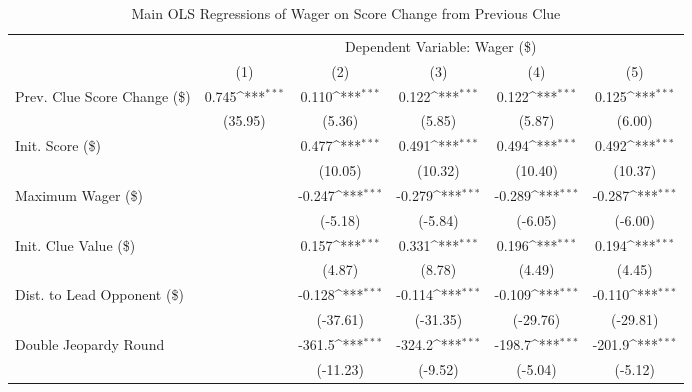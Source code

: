 \begin{table}[htbp]\centering
\def\sym#1{\ifmmode^{#1}\else\(^{#1}\)\fi}
\caption{Main OLS Regressions of Wager on Score Change from Previous Clue}
\begin{tabular}{l*{5}{c}}
\hline\hline
            &\multicolumn{5}{c}{Dependent Variable: Wager (\$)}                                                           \\
            &\multicolumn{1}{c}{(1)}         &\multicolumn{1}{c}{(2)}         &\multicolumn{1}{c}{(3)}         &\multicolumn{1}{c}{(4)}         &\multicolumn{1}{c}{(5)}         \\
\hline
Prev. Clue Score Change (\$)&       0.745\sym{***}&       0.110\sym{***}&       0.122\sym{***}&       0.122\sym{***}&       0.125\sym{***}\\
            &     (35.95)         &      (5.36)         &      (5.85)         &      (5.87)         &      (6.00)         \\
Init. Score (\$)&                     &       0.477\sym{***}&       0.491\sym{***}&       0.494\sym{***}&       0.492\sym{***}\\
            &                     &     (10.05)         &     (10.32)         &     (10.40)         &     (10.37)         \\
Maximum Wager (\$)&                     &      -0.247\sym{***}&      -0.279\sym{***}&      -0.289\sym{***}&      -0.287\sym{***}\\
            &                     &     (-5.18)         &     (-5.84)         &     (-6.05)         &     (-6.00)         \\
Init. Clue Value (\$)&                     &       0.157\sym{***}&       0.331\sym{***}&       0.196\sym{***}&       0.194\sym{***}\\
            &                     &      (4.87)         &      (8.78)         &      (4.49)         &      (4.45)         \\
Dist. to Lead Opponent (\$)&                     &      -0.128\sym{***}&      -0.114\sym{***}&      -0.109\sym{***}&      -0.110\sym{***}\\
            &                     &    (-37.61)         &    (-31.35)         &    (-29.76)         &    (-29.81)         \\
Double Jeopardy Round&                     &      -361.5\sym{***}&      -324.2\sym{***}&      -198.7\sym{***}&      -201.9\sym{***}\\
            &                     &    (-11.23)         &     (-9.52)         &     (-5.04)         &     (-5.12)         \\

\end{tabular}
\end{table}
